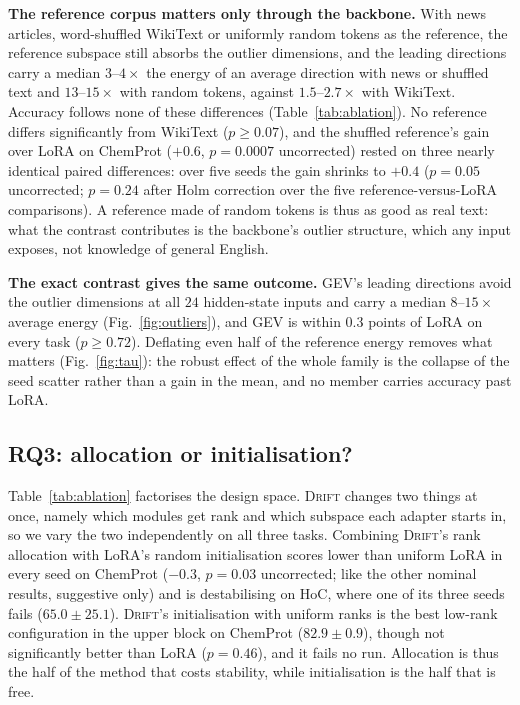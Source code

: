 \documentclass[conference]{IEEEtran}
\newcommand{\method}{\textsc{Drift}}
\begin{document}
\noindent\textbf{The reference corpus matters only through the backbone.} With
news articles, word-shuffled WikiText or uniformly random tokens as the
reference, the reference subspace still absorbs the outlier dimensions, and the
leading directions carry a median $3$--$4\times$ the energy of an average
direction with news or shuffled text and $13$--$15\times$ with random tokens,
against $1.5$--$2.7\times$ with WikiText. Accuracy follows none of these
differences (Table~\ref{tab:ablation}). No reference differs significantly from
WikiText ($p \ge 0.07$), and the shuffled reference's gain over LoRA on ChemProt
($+0.6$, $p = 0.0007$ uncorrected) rested on three nearly identical paired
differences: over five seeds the gain shrinks to $+0.4$ ($p = 0.05$
uncorrected; $p = 0.24$ after Holm correction over the five reference-versus-LoRA
comparisons). A reference made of random tokens is thus as good as real text:
what the contrast contributes is the backbone's outlier structure, which any
input exposes, not knowledge of general English.

\noindent\textbf{The exact contrast gives the same outcome.} GEV's leading
directions avoid the outlier dimensions at all $24$ hidden-state inputs and carry
a median $8$--$15\times$ average energy (Fig.~\ref{fig:outliers}), and GEV is
within $0.3$ points of LoRA on every task ($p \ge 0.72$). Deflating even half of
the reference energy removes what matters (Fig.~\ref{fig:tau}): the robust
effect of the whole family is the collapse of the seed scatter rather than a gain
in the mean, and no member carries accuracy past LoRA.

\subsection{RQ3: allocation or initialisation?}
\label{sec:ablation}


Table~\ref{tab:ablation} factorises the design space. \method{} changes two
things at once, namely which modules get rank and which subspace each adapter
starts in, so we vary the two independently on all three tasks. Combining
\method{}'s rank allocation with LoRA's random initialisation scores lower than
uniform LoRA in every seed on ChemProt ($-0.3$, $p = 0.03$ uncorrected; like the
other nominal results, suggestive only) and is destabilising on HoC, where one of
its three seeds fails ($65.0\pm25.1$). \method{}'s initialisation with uniform
ranks is the best low-rank configuration in the upper block on ChemProt
($82.9\pm0.9$), though not significantly better than LoRA ($p = 0.46$), and it
fails no run. Allocation is thus the half of the method that costs stability,
while initialisation is the half that is free.
\end{document}
